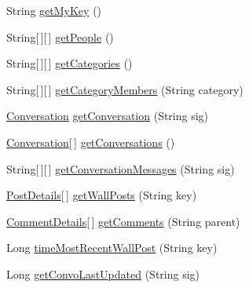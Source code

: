 \begin{DoxyCompactItemize}
\item 
String \hyperlink{interfaceballmerpeak_1_1turtlenet_1_1client_1_1Turtlenet_a92f271e68b3fe28daaff65852546f0b7}{get\-My\-Key} ()
\item 
String\mbox{[}$\,$\mbox{]}\mbox{[}$\,$\mbox{]} \hyperlink{interfaceballmerpeak_1_1turtlenet_1_1client_1_1Turtlenet_ac9f6b1c3381cbfe692ec418c5a20de72}{get\-People} ()
\item 
String\mbox{[}$\,$\mbox{]}\mbox{[}$\,$\mbox{]} \hyperlink{interfaceballmerpeak_1_1turtlenet_1_1client_1_1Turtlenet_a1576427e28630ba76693f57bb6c6e8e5}{get\-Categories} ()
\item 
String\mbox{[}$\,$\mbox{]}\mbox{[}$\,$\mbox{]} \hyperlink{interfaceballmerpeak_1_1turtlenet_1_1client_1_1Turtlenet_a672211366da676547b6f23e7cab5b3d2}{get\-Category\-Members} (String category)
\item 
\hyperlink{classballmerpeak_1_1turtlenet_1_1shared_1_1Conversation}{Conversation} \hyperlink{interfaceballmerpeak_1_1turtlenet_1_1client_1_1Turtlenet_aee477261c671b6a20237d0fa8ddab7f0}{get\-Conversation} (String sig)
\item 
\hyperlink{classballmerpeak_1_1turtlenet_1_1shared_1_1Conversation}{Conversation}\mbox{[}$\,$\mbox{]} \hyperlink{interfaceballmerpeak_1_1turtlenet_1_1client_1_1Turtlenet_a2282dffbbc36f3398c0498c95629056f}{get\-Conversations} ()
\item 
String\mbox{[}$\,$\mbox{]}\mbox{[}$\,$\mbox{]} \hyperlink{interfaceballmerpeak_1_1turtlenet_1_1client_1_1Turtlenet_a6f2114b1e820a9c8fcfce3c9be6de12b}{get\-Conversation\-Messages} (String sig)
\item 
\hyperlink{classballmerpeak_1_1turtlenet_1_1shared_1_1PostDetails}{Post\-Details}\mbox{[}$\,$\mbox{]} \hyperlink{interfaceballmerpeak_1_1turtlenet_1_1client_1_1Turtlenet_a162a9e8f6101fc27d58a372735cd3702}{get\-Wall\-Posts} (String key)
\item 
\hyperlink{classballmerpeak_1_1turtlenet_1_1shared_1_1CommentDetails}{Comment\-Details}\mbox{[}$\,$\mbox{]} \hyperlink{interfaceballmerpeak_1_1turtlenet_1_1client_1_1Turtlenet_aeae3b123fbfea489eb6888dbc896aaca}{get\-Comments} (String parent)
\item 
Long \hyperlink{interfaceballmerpeak_1_1turtlenet_1_1client_1_1Turtlenet_a3859f33caf36133dbdb56c306e496f33}{time\-Most\-Recent\-Wall\-Post} (String key)
\item 
Long \hyperlink{interfaceballmerpeak_1_1turtlenet_1_1client_1_1Turtlenet_aef7a6b32445ad461aee9206782e7a23a}{get\-Convo\-Last\-Updated} (String sig)
\item 

\end{DoxyCompactItemize}
